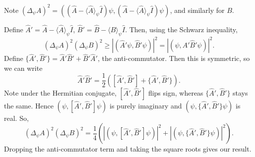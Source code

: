\documentclass[12pt]{article}
\begin{document}
\begin{proofbox}
	Note $(\Delta_{\psi}A)^2 = ((\hat A - \langle \hat A \rangle_{\psi} \hat I) \psi, (\hat A - \langle \hat A \rangle_{\psi} \hat I)\psi)$, and similarly for $B$.

	Define $\hat A' = \hat A - \langle \hat A \rangle_{\psi} \hat I$, $\hat B' = \hat B - \langle \hat B \rangle_{\psi} \hat I$. Then, using the Schwarz inequality,
	\[
		(\Delta_{\psi}A)^2(\Delta_{\psi}B)^2 \geq |(\hat A' \psi, \hat B' \psi)|^2 = |(\psi, \hat A' \hat B' \psi)|^2
	.\]
	Define $\{\hat A', \hat B'\} = \hat A' \hat B' + \hat B' \hat A'$, the anti-commutator. Then this is symmetric, so we can write
	\[
		\hat A' \hat B' = \frac{1}{2} ([\hat A', \hat B'] + \{\hat A', \hat B'\})
	.\]
	Note under the Hermitian conjugate, $[\hat A', \hat B']$ flips sign, whereas $\{\hat A', \hat B'\}$ stays the same. Hence $(\psi, [\hat A', \hat B']\psi)$ is purely imaginary and $(\psi, \{\hat A', \hat B'\}\psi)$ is real. So,
	\[
		(\Delta_{\psi} A)^2 (\Delta_{\psi}B)^2 = \frac{1}{4} (|(\psi, [\hat A', \hat B']\psi)|^2 + |(\psi, \{\hat A', \hat B'\}\psi)|^2)
	.\]
	Dropping the anti-commutator term and taking the square roots gives our result.
\end{proofbox}




\newpage

\printindex
\end{document}
